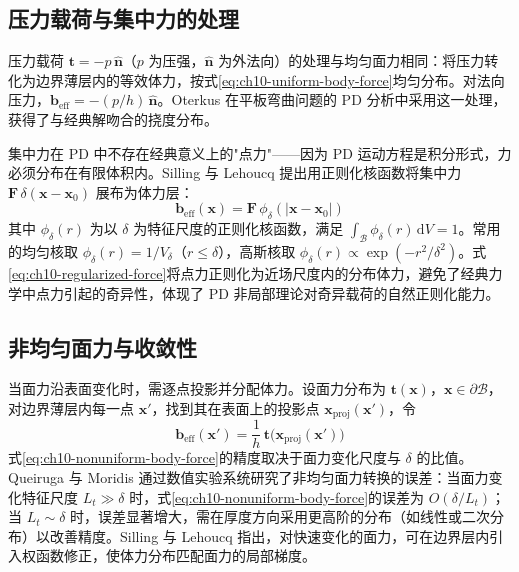 \subsection{压力载荷与集中力的处理}

压力载荷 $\mathbf{t}=-p\,\hat{\mathbf{n}}$（$p$ 为压强，$\hat{\mathbf{n}}$ 为外法向）的处理与均匀面力相同：将压力转化为边界薄层内的等效体力，按式\eqref{eq:ch10-uniform-body-force}均匀分布。对法向压力，$\mathbf{b}_{\text{eff}}=-(p/h)\,\hat{\mathbf{n}}$。Oterkus \cite{Oterkus2014} 在平板弯曲问题的 PD 分析中采用这一处理，获得了与经典解吻合的挠度分布。

集中力在 PD 中不存在经典意义上的"点力"——因为 PD 运动方程是积分形式，力必须分布在有限体积内。Silling 与 Lehoucq \cite{SillingLehoucq2010} 提出用正则化核函数将集中力 $\mathbf{F}\,\delta(\mathbf{x}-\mathbf{x}_{0})$ 展布为体力层：
\begin{equation}
\mathbf{b}_{\text{eff}}(\mathbf{x}) = \mathbf{F}\,\phi_{\delta}(|\mathbf{x}-\mathbf{x}_{0}|)
\label{eq:ch10-regularized-force}
\end{equation}
其中 $\phi_{\delta}(r)$ 为以 $\delta$ 为特征尺度的正则化核函数，满足 $\int_{\mathcal{B}}\phi_{\delta}(r)\,\mathrm{d}V=1$。常用的均匀核取 $\phi_{\delta}(r)=1/V_{\delta}$（$r\le\delta$），高斯核取 $\phi_{\delta}(r)\propto\exp(-r^{2}/\delta^{2})$。式\eqref{eq:ch10-regularized-force}将点力正则化为近场尺度内的分布体力，避免了经典力学中点力引起的奇异性，体现了 PD 非局部理论对奇异载荷的自然正则化能力。

\subsection{非均匀面力与收敛性}

当面力沿表面变化时，需逐点投影并分配体力。设面力分布为 $\mathbf{t}(\mathbf{x})$，$\mathbf{x}\in\partial\mathcal{B}$，对边界薄层内每一点 $\mathbf{x}'$，找到其在表面上的投影点 $\mathbf{x}_{\text{proj}}(\mathbf{x}')$，令
\begin{equation}
\mathbf{b}_{\text{eff}}(\mathbf{x}') = \frac{1}{h}\,\mathbf{t}\bigl(\mathbf{x}_{\text{proj}}(\mathbf{x}')\bigr)
\label{eq:ch10-nonuniform-body-force}
\end{equation}
式\eqref{eq:ch10-nonuniform-body-force}的精度取决于面力变化尺度与 $\delta$ 的比值。Queiruga 与 Moridis \cite{QueirugaMoridis2017} 通过数值实验系统研究了非均匀面力转换的误差：当面力变化特征尺度 $L_{t}\gg\delta$ 时，式\eqref{eq:ch10-nonuniform-body-force}的误差为 $O(\delta/L_{t})$；当 $L_{t}\sim\delta$ 时，误差显著增大，需在厚度方向采用更高阶的分布（如线性或二次分布）以改善精度。Silling 与 Lehoucq \cite{SillingLehoucq2008} 指出，对快速变化的面力，可在边界层内引入权函数修正，使体力分布匹配面力的局部梯度。

